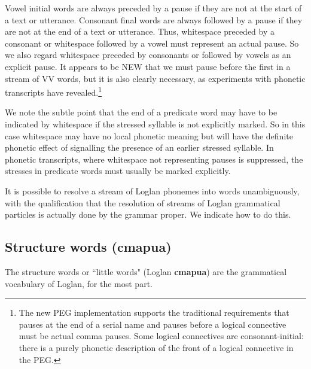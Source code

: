 \documentclass[12pt]{book}
\begin{document}
Vowel initial words are always preceded by a pause if they are not at the start of a text or utterance.  Consonant final words are always followed by a pause if they are not at the end of a text or utterance.  Thus, whitespace preceded by a consonant or whitespace followed by a vowel must represent an actual pause.  So we also regard whitespace preceded by consonants or followed by vowels
as an explicit pause.  It appears to be NEW that we must pause before the first in a stream of VV words, but it is also clearly necessary, as experiments with phonetic transcripts have revealed.\footnote{The new PEG implementation supports the traditional requirements
that pauses at the end of a serial name and pauses before a logical connective must be actual comma pauses.  Some logical connectives are consonant-initial:  there is a purely phonetic description of the front of a logical connective in the PEG.}

We note the subtle point that the end of a predicate word may have to be indicated by whitespace if the stressed syllable is not explicitly marked.  So in this case whitespace may have no local phonetic meaning but will have the definite phonetic effect of signalling the presence of an earlier stressed syllable.  In phonetic transcripts, where whitespace not representing  pauses is suppressed, the stresses in predicate words must usually be marked explicitly.

It is possible to resolve a stream of Loglan phonemes into words unambiguously, with the qualification that the resolution of streams of Loglan grammatical particles is actually done by the grammar proper.  We indicate how to do this.

\subsection{Structure words (cmapua)}

The structure words or ``little words" (Loglan {\bf cmapua}) are the grammatical vocabulary of Loglan, for the most part.
\end{document}
